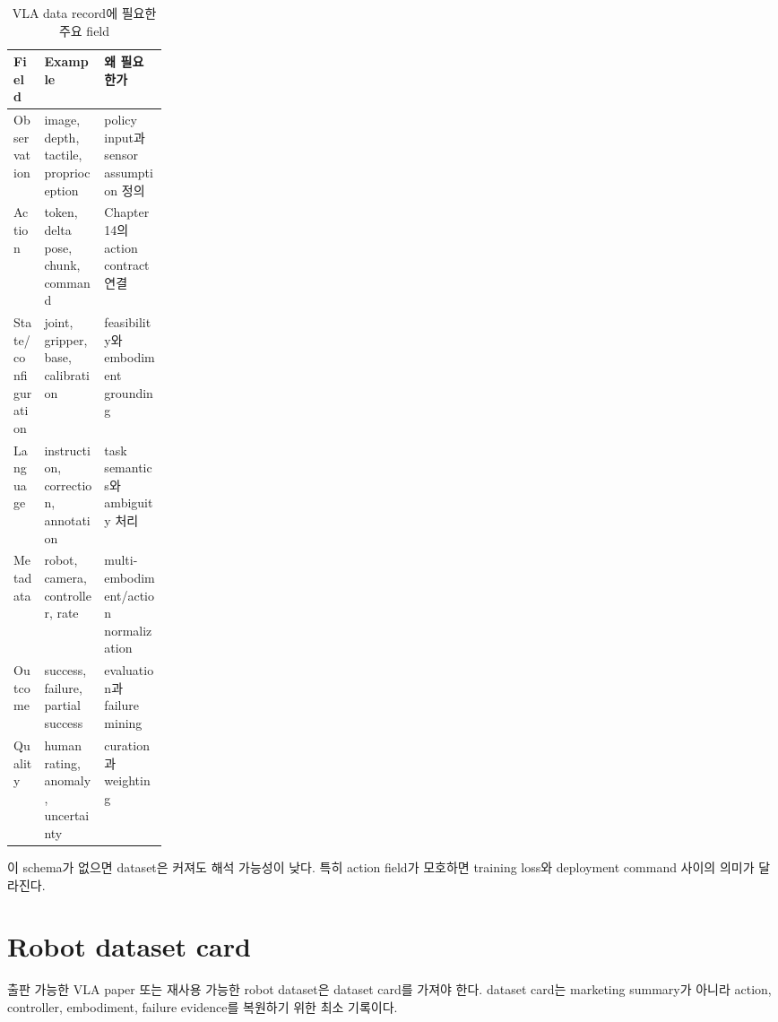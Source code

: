 \begin{table}[h]
  \centering
  \caption{VLA data record에 필요한 주요 field}
  \begin{tabularx}{\linewidth}{p{0.2\linewidth}X X}
    \toprule
    Field & Example & 왜 필요한가 \\
    \midrule
    Observation & image, depth, tactile, proprioception & policy input과 sensor assumption 정의 \\
    Action & token, delta pose, chunk, command & Chapter 14의 action contract 연결 \\
    State/configuration & joint, gripper, base, calibration & feasibility와 embodiment grounding \\
    Language & instruction, correction, annotation & task semantics와 ambiguity 처리 \\
    Metadata & robot, camera, controller, rate & multi-embodiment/action normalization \\
    Outcome & success, failure, partial success & evaluation과 failure mining \\
    Quality & human rating, anomaly, uncertainty & curation과 weighting \\
    \bottomrule
  \end{tabularx}
  \label{tab:ch14-record-schema}
\end{table}

이 schema가 없으면 dataset은 커져도 해석 가능성이 낮다. 특히 action field가 모호하면 training loss와 deployment command 사이의 의미가 달라진다.

\section{Robot dataset card}

출판 가능한 VLA paper 또는 재사용 가능한 robot dataset은 dataset card를 가져야 한다. dataset card는 marketing summary가 아니라 action, controller, embodiment, failure evidence를 복원하기 위한 최소 기록이다.

